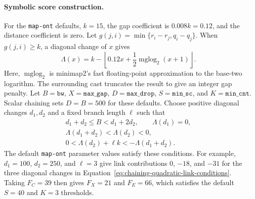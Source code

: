 \paragraph{Symbolic score construction.}
For the \texttt{map-ont} defaults, \(k=15\), the gap coefficient is
\(0.008k=0.12\), and the distance coefficient is zero. Let
\(g(j,i)=\min\{r_i-r_j,q_i-q_j\}\). When \(g(j,i)\geq k\), a diagonal
change of \(x\) gives
\begin{equation}
  \Lambda(x)=k-
  \left\lfloor
    0.12x+\frac{1}{2}\operatorname{mglog}_{2}(x+1)
  \right\rfloor.
  \label{eq:chaining-map-ont-symbolic-link}
\end{equation}
Here, \(\operatorname{mglog}_{2}\) is minimap2's fast floating-point approximation to the
base-two logarithm. The surrounding cast truncates the result to give an integer gap penalty.
Let \(B=\texttt{bw}\), \(X=\texttt{max\_gap}\),
\(D=\texttt{max\_drop}\), \(S=\texttt{min\_sc}\), and
\(K=\texttt{min\_cnt}\). Scalar chaining sets \(D=B=500\) for these defaults.
Choose positive diagonal changes \(d_1,d_2\) and a fixed branch length
\(\ell\) such that
\begin{equation}
\begin{gathered}
  d_1+d_2\leq B<d_1+2d_2,\qquad \Lambda(d_1)=0,\\
  \Lambda(d_1+d_2)<\Lambda(d_2)<0,\\
  0<\Lambda(d_2)+\ell k<-\Lambda(d_1+d_2).
\end{gathered}
\label{eq:chaining-quadratic-link-conditions}
\end{equation}
The default \texttt{map-ont} parameter values satisfy these conditions. For
example,
\(d_1=100\), \(d_2=250\), and \(\ell=3\) give link contributions
\(0\), \(-18\), and \(-31\) for the three diagonal changes in
Equation~\ref{eq:chaining-quadratic-link-conditions}. Taking \(F_C=39\)
then gives \(F_X=21\) and \(F_E=66\), which satisfies the default
\(S=40\) and \(K=3\) thresholds.

